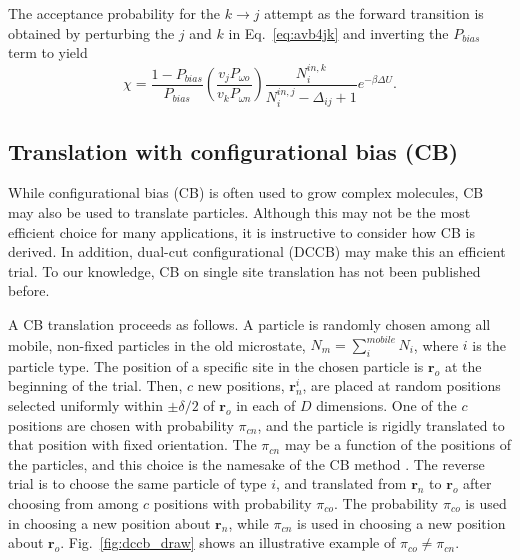 \documentclass[
  9pt,
  bestpractices,
  pubversion,
]{livecoms}
\begin{document}
The acceptance probability for the $k\rightarrow j$ attempt as the forward transition is obtained by perturbing the $j$ and $k$ in Eq.~\ref{eq:avb4jk} and inverting the $P_{bias}$ term to yield
\begin{equation}
\chi = \frac{1-P_{bias}}{P_{bias}}\left(\frac{v_j P_{\omega o}}{v_k P_{\omega n}}\right)\frac{N_i^{in,k}}{N_i^{in,j} - \Delta_{ij} + 1}e^{-\beta \Delta U}.
\label{eq:avb3inin}
\end{equation}


\subsection{\label{sec:lhs_disp_cb}Translation with configurational bias (CB)}

While configurational bias (CB) is often used to grow complex molecules, CB may also be used to translate particles.
Although this may not be the most efficient choice for many applications, it is instructive to consider how CB is derived.
In addition, dual-cut configurational (DCCB) \cite{vlugt_improving_1998} may make this an efficient trial.
To our knowledge, CB on single site translation has not been published before.

A CB translation proceeds as follows.
A particle is randomly chosen among all mobile, non-fixed particles in the old microstate, $N_m=\sum_i^{mobile} N_i$, where $i$ is the particle type.
The position of a specific site in the chosen particle is $\mathbf{r}_o$ at the beginning of the trial.
Then, $c$ new positions, $\mathbf{r}_n^i$, are placed at random positions selected uniformly within $\pm\delta/2$ of $\mathbf{r}_o$ in each of $D$ dimensions.
One of the $c$ positions are chosen with probability $\pi_{cn}$, and the particle is rigidly translated to that position with fixed orientation.
The $\pi_{cn}$ may be a function of the positions of the particles, and this choice is the namesake of the CB method \cite{siepmann_configurational_1992}.
The reverse trial is to choose the same particle of type $i$, and translated from $\mathbf{r}_n$ to $\mathbf{r}_o$ after choosing from among $c$ positions with probability $\pi_{co}$.
The probability $\pi_{co}$ is used in choosing a new position about $\mathbf{r}_n$, while $\pi_{cn}$ is used in choosing a new position about $\mathbf{r}_o$.
Fig.~\ref{fig:dccb_draw} shows an illustrative example of $\pi_{co} \neq \pi_{cn}$.
\end{document}
